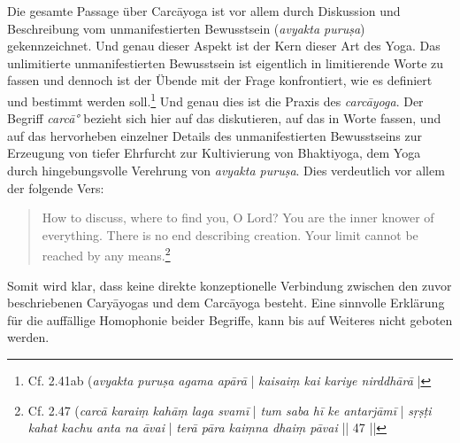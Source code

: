 Die gesamte Passage über Carcāyoga ist vor allem durch Diskussion und Beschreibung vom unmanifestierten Bewusstsein (\textit{avyakta puruṣa}) gekennzeichnet. Und genau dieser Aspekt ist der Kern dieser Art des Yoga. Das unlimitierte unmanifestierten Bewusstsein ist eigentlich in limitierende Worte zu fassen und dennoch ist der Übende mit der Frage konfrontiert, wie es definiert und bestimmt werden soll.\footnote{Cf.  2.41ab (\textit{avyakta puruṣa agama apārā} | \textit{kaisaiṃ kai kariye nirddhārā} |} Und genau dies ist die Praxis des \textit{carcāyoga}. Der Begriff \textit{carcā°} bezieht sich hier auf das diskutieren, auf das in Worte fassen, und auf das hervorheben einzelner Details des unmanifestierten Bewusstseins zur Erzeugung von tiefer Ehrfurcht zur Kultivierung von Bhaktiyoga, dem Yoga durch hingebungsvolle Verehrung von \textit{avyakta puruṣa}. Dies verdeutlich vor allem der folgende Vers:
\begin{quote}
How to discuss, where to find you, O Lord? You are the inner knower of everything. There is no end describing creation. Your limit cannot be reached by any means.\footnote{Cf.  2.47 (\textit{carcā karaiṃ kahāṃ laga svamī} | \textit{tum saba hī ke antarjāmī} | \textit{sṛṣṭi kahat kachu anta na āvai} | \textit{terā pāra kaiṃna dhaiṃ pāvai} || 47 ||} \end{quote}

Somit wird klar, dass keine direkte konzeptionelle Verbindung zwischen den zuvor beschriebenen Caryāyogas und dem Carcāyoga besteht. Eine sinnvolle Erklärung für die auffällige Homophonie beider Begriffe, kann bis auf Weiteres nicht geboten werden.  




